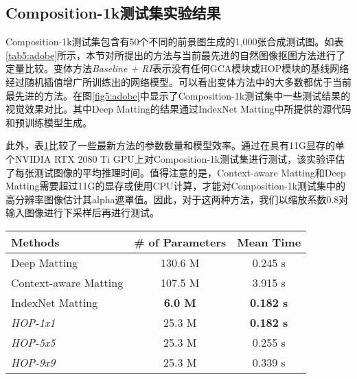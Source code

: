 \subsection{Composition-1k测试集实验结果}
Composition-1k测试集\cite{xu2017deep}包含有50个不同的前景图生成的1,000张合成测试图。如表\ref{tab5:adobe}所示，本节对所提出的方法与当前最先进的自然图像抠图方法进行了定量比较。变体方法\textit{Baseline + RI}表示没有任何GCA模块或HOP模块的基线网络经过随机插值增广所训练出的网络模型。可以看出变体方法中的大多数都优于当前最先进的方法。在图\ref{fig5:adobe}中显示了Composition-1k测试集中一些测试结果的视觉效果对比。其中Deep Matting\cite{xu2017deep}的结果通过IndexNet Matting\cite{lu2019indices}中所提供的源代码和预训练模型生成。

此外，表\ref{tab5:eff}比较了一些最新方法的参数数量和模型效率。通过在具有11G显存的单个NVIDIA RTX 2080 Ti GPU上对Composition-1k测试集进行测试，该实验评估了每张测试图像的平均推理时间。值得注意的是，Context-aware Matting\cite{hou2019context}和Deep Matting\cite{xu2017deep}需要超过11G的显存或使用CPU计算，才能对Composition-1k测试集中的高分辨率图像估计其alpha遮罩值。因此，对于这两种方法，我们以缩放系数0.8对输入图像进行下采样后再进行测试。


\begin{table}[t]
	\setlength{\tabcolsep}{15pt}
	\centering
	\begin{tabular}{l|cc}  
		\toprule
		Methods & \# of Parameters & Mean Time \\
		\midrule
		Deep Matting\cite{xu2017deep} &	130.6 M & 0.245 s \\
		Context-aware Matting\cite{hou2019context} & 107.5 M & 3.915 s\\
		IndexNet Matting\cite{lu2019indices} &	\textbf{6.0 M} &\textbf{ 0.182 s}\\	
		\midrule
		\textit{HOP-1x1} & 25.3 M & \textbf{0.182 s} \\
		\textit{HOP-5x5} & 25.3 M & 0.255 s \\
		\textit{HOP-9x9} & 25.3 M & 0.339 s \\
		\bottomrule
	\end{tabular}
	\label{tab5:eff}
\end{table}

